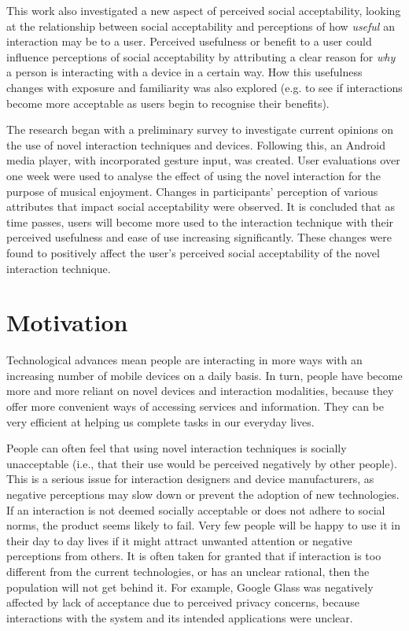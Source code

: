 \documentclass{l4proj}
\begin{document}
This work also investigated a new aspect of perceived social acceptability, looking at the relationship between social acceptability and perceptions of how \textit{useful} an interaction may be to a user. Perceived usefulness or benefit to a user could influence perceptions of social acceptability by attributing a clear reason for \textit{why} a person is interacting with a device in a certain way. How this usefulness changes with exposure and familiarity was also explored (e.g. to see if interactions become more acceptable as users begin to recognise their benefits).

The research began with a preliminary survey to investigate current opinions on the use of novel interaction techniques and devices. Following this, an Android media player, with incorporated gesture input, was created. User evaluations over one week were used to analyse the effect of using the novel interaction for the purpose of musical enjoyment. Changes in participants' perception of various attributes that impact social acceptability were observed. It is concluded that as time passes, users will become more used to the interaction technique with their perceived usefulness and ease of use  increasing significantly. These changes were found to positively affect the user's perceived social acceptability of the novel interaction technique.


\section{Motivation}
Technological advances mean people are interacting in more ways with an increasing number of mobile devices on a daily basis. In turn, people have become more and more reliant on novel devices and interaction modalities, because they offer more convenient ways of accessing services and information. They can be very efficient at helping us complete tasks in our everyday lives. 

People can often feel that using novel interaction techniques is socially unacceptable (i.e., that their use would be perceived negatively by other people). This is a serious issue for interaction designers and device manufacturers, as negative perceptions may slow down or prevent the adoption of new technologies. If an interaction is not deemed socially acceptable or does not adhere to social norms, the product seems likely to fail. Very few people will be happy to use it in their day to day lives if it might attract unwanted attention or negative perceptions from others.  It is often taken for granted that if interaction is too different from the current technologies, or has an unclear rational, then the population will not get behind it. For example, Google Glass was negatively affected by lack of acceptance due to perceived privacy concerns, because interactions with the system and its intended applications were unclear.
\end{document}
